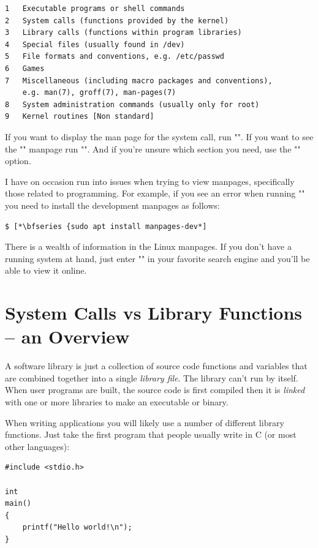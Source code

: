 \begin{lstlisting}
1   Executable programs or shell commands
2   System calls (functions provided by the kernel)
3   Library calls (functions within program libraries)
4   Special files (usually found in /dev)
5   File formats and conventions, e.g. /etc/passwd
6   Games
7   Miscellaneous (including macro packages and conventions),
	e.g. man(7), groff(7), man-pages(7)
8   System administration commands (usually only for root)
9   Kernel routines [Non standard]
\end{lstlisting}

\noindent
If you want to display the man page for the  system call, run "". If you want to see the "" manpage run "". And if you're unsure which section you need, use the "" option. 

I have on occasion run into issues when trying to view manpages, specifically those related to programming. For example, if you see an error when running "" you need to install the development manpages as follows:

\begin{lstlisting}
$ [*\bfseries {sudo apt install manpages-dev*]
\end{lstlisting}

\noindent
There is a wealth of information in the Linux manpages. If you don't have a running system at hand, just enter "" in your favorite search engine and you'll be able to view it online.

\section{System Calls vs Library Functions -- an Overview}

A software library is just a collection of source code functions and variables that are combined together into a single \textit{library file}. The library can't run by itself. When user programs are built, the source code is first compiled then it is \textit{linked} with one or more libraries to make an executable or binary.

When writing applications you will likely use a number of different library functions. Just take the first program that people usually write in C (or most other languages):

\begin{lstlisting}
#include <stdio.h>

int 
main()
{
	printf("Hello world!\n");
}
\end{lstlisting}

